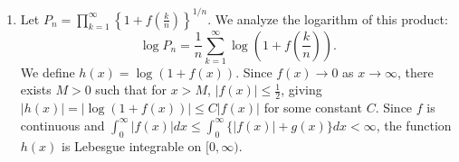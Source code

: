 \documentclass[10pt,a4paper]{article}
\begin{document}
\begin{enumerate}[label=\fbox{\arabic*}]
        The identification $(p, a) \sim (a, p)$ glues the two 1-cells $e_1^1$ and $e_2^1$ together. In the quotient space $X$, they become a single 1-cell $e^1$.
        The boundary of the 2-cell $e^2$ in the quotient space follows the word $e^1 e^1 (e^1)^{-1} (e^1)^{-1} = 1$. This means that the attaching map for the 2-cell is null-homotopic.
        Thus, the CW complex for $X$ consists of one 0-cell, one 1-cell, and one 2-cell, with all boundary maps in the cellular chain complex being identically zero:
        \[
          0 \to \mathbb{Z} \xrightarrow{0} \mathbb{Z} \xrightarrow{0} \mathbb{Z} \to 0.
        \]
        The homology groups $H_k(X) = \operatorname{Ker}(\partial_k) / \operatorname{Im}(\partial_{k+1})$ are therefore given by the chain groups themselves:
        \begin{align*}
          H_0(X) &\cong \mathbb{Z}, \\
          H_1(X) &\cong \mathbb{Z}, \\
          H_2(X) &\cong \mathbb{Z}, \\
          H_k(X) &= 0 \quad (k \ge 3).
        \end{align*}
        Geometrically, since the 2-cell is attached trivially along a point, $X$ is homotopy equivalent to the wedge sum of a circle and a sphere, $S^1 \vee S^2$, which yields the same homology groups.

  \item %
        Let $P_n = \prod_{k=1}^\infty \left\{ 1 + f\left(\frac{k}{n}\right) \right\}^{1/n}$. We analyze the logarithm of this product:
        \[
          \log P_n = \frac{1}{n} \sum_{k=1}^\infty \log\left( 1 + f\left(\frac{k}{n}\right) \right).
        \]
        We define $h(x) = \log(1 + f(x))$. Since $f(x) \to 0$ as $x \to \infty$, there exists $M > 0$ such that for $x > M$, $|f(x)| \le \frac{1}{2}$, giving $|h(x)| = |\log(1+f(x))| \le C|f(x)|$ for some constant $C$. Since $f$ is continuous and $\int_0^\infty |f(x)| dx \le \int_0^\infty \{|f(x)| + g(x)\} dx < \infty$, the function $h(x)$ is Lebesgue integrable on $[0, \infty)$.
        

\end{enumerate}
\end{document}
